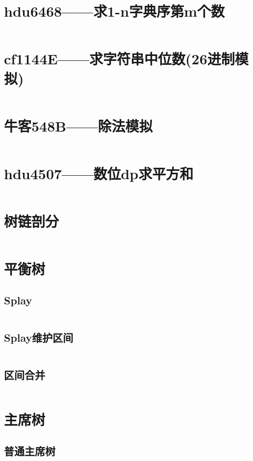 \documentclass[a4paper,11pt]{article}
\begin{document}
\newpage
\section*{hdu6468——求1-n字典序第m个数}
\inputminted[]{c++}{Template/Other/hdu6468.cpp}
\section*{cf1144E——求字符串中位数(26进制模拟)}
\inputminted[]{c++}{Template/Other/cf1144E.cpp}
\section*{牛客548B——除法模拟}
\inputminted[]{c++}{Template/Other/548B.cpp}
\section*{hdu4507——数位dp求平方和}
\inputminted[]{c++}{Template/Other/hdu4507.cpp}

\newpage
\section*{树链剖分}
\inputminted[]{c++}{Template/DataStructure/TreeChainSplit.cpp}
\newpage
\section*{平衡树}
\subsection*{Splay}
\inputminted[]{c++}{Template/DataStructure/luoguP3369.cpp}
\subsection*{Splay维护区间}
\inputminted[]{c++}{Template/DataStructure/luoguP3391.cpp}

\newpage
\subsection*{区间合并}
\inputminted[]{c++}{Template/Segment/SegTreeIV.cpp}
\newpage
\section*{主席树}
\subsection*{普通主席树}
\inputminted[]{c++}{Template/DataStructure/ChairManTreeI.cpp}
\newpage
\end{document}
